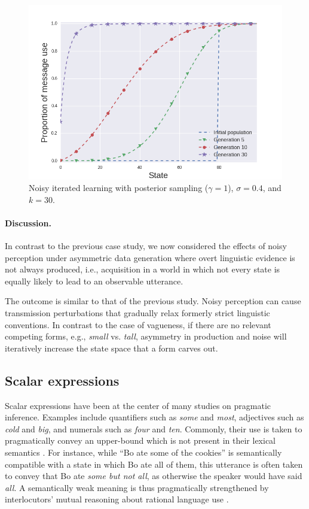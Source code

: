 \documentclass[10pt,a4paper]{article}
\newcommand{\postparameter}{\ensuremath{\gamma}}
\begin{document}
\begin{figure}[ht]
\centering
    \includegraphics[scale=0.4]{../code/plots/deflation-sigma04.png}
  \caption{Noisy iterated learning with posterior sampling ($\postparameter=1$), $\sigma = 0.4$, and $k = 30$.}
  \label{fig:defl}
\end{figure}

\paragraph{Discussion.} In contrast to the previous case study, we now considered the effects
of noisy perception under asymmetric data generation where overt linguistic evidence is not
always produced, i.e., acquisition in a world in which not every state is equally likely to lead to an observable
utterance. %

The outcome is similar to that of the previous study. Noisy perception can cause transmission
perturbations that gradually relax formerly strict linguistic conventions. In contrast to the
case of vagueness, if there are no relevant competing forms, e.g., {\em small} vs. {\em tall},
asymmetry in production and noise will iteratively increase the state space that a form carves
out.

\subsection{Scalar expressions}
Scalar expressions have been at the center of many studies on pragmatic inference. Examples
include quantifiers such as {\em some} and {\em most}, adjectives such as {\em cold} and {\em
  big}, and numerals such as {\em four} and {\em ten}. Commonly, their use is taken to
pragmatically convey an upper-bound which is not present in their lexical semantics
\citep{horn:1972,gazdar:1979}. For instance, while ``Bo ate some of the cookies'' is
semantically compatible with a state in which Bo ate all of them, this utterance is often taken to convey 
that Bo ate {\em some but not all}, as otherwise the speaker would have said {\em all}. A
semantically weak meaning is thus pragmatically strengthened by interlocutors' mutual reasoning
about rational language use \citep{grice:1975}. 
\end{document}
